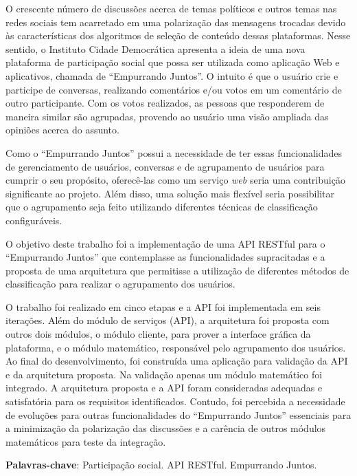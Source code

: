 \begin{resumo}
O crescente número de discussões acerca de temas políticos e outros temas nas redes sociais tem acarretado em uma polarização
das mensagens trocadas devido às características dos algoritmos de seleção de conteúdo dessas plataformas.
Nesse sentido, o Instituto Cidade Democrática apresenta a ideia de uma nova plataforma de participação social
que possa ser utilizada como aplicação Web e aplicativos, chamada de ``Empurrando Juntos''.
O intuito é que o usuário crie e participe de conversas, realizando comentários e/ou votos em um comentário de outro participante.
Com os votos realizados, as pessoas que responderem de maneira similar são agrupadas,
provendo ao usuário uma visão ampliada das opiniões acerca do assunto.
%

Como o ``Empurrando Juntos'' possui a necessidade de ter essas funcionalidades de
gerenciamento de usuários, conversas e de agrupamento de usuários para cumprir o seu propósito,
oferecê-las como um serviço \textit{web} seria uma contribuição significante ao projeto.
Além disso, uma solução mais flexível seria possibilitar que  o agrupamento seja feito
utilizando diferentes técnicas de classificação configuráveis.
%

O objetivo deste trabalho foi a implementação de uma API RESTful para o ``Empurrando Juntos''
que contemplasse as funcionalidades supracitadas e a proposta de uma arquitetura que permitisse a utilização de diferentes
métodos de classificação para realizar o agrupamento dos usuários.
%

O trabalho foi realizado em cinco etapas e a API foi implementada em seis iterações. Além do módulo de serviços (API), a arquitetura foi proposta com outros dois módulos, o módulo cliente, para prover a interface gráfica da plataforma, 
e o módulo matemático, responsável pelo agrupamento dos usuários. 
Ao final do desenvolvimento, foi construída uma aplicação para validação da API e da arquitetura proposta. Na validação apenas um módulo matemático foi integrado. A arquitetura proposta e a API foram consideradas adequadas e satisfatória para os requisitos identificados.
Contudo, foi percebida a necessidade de evoluções para outras funcionalidades do ``Empurrando Juntos'' essenciais
para a minimização da polarização das discussões e a carência de outros módulos matemáticos para teste da integração.
%

\vspace{\onelineskip}


\noindent
\textbf{Palavras-chave}: Participação social. API RESTful. Empurrando Juntos.
\end{resumo}
